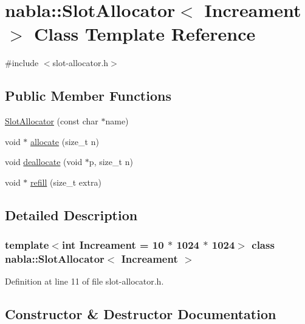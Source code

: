 \hypertarget{classnabla_1_1_slot_allocator}{}\section{nabla\+::Slot\+Allocator$<$ Increament $>$ Class Template Reference}
\label{classnabla_1_1_slot_allocator}


{\ttfamily \#include $<$slot-\/allocator.\+h$>$}

\subsection*{Public Member Functions}
\begin{DoxyCompactItemize}
\item 
\mbox{\hyperlink{classnabla_1_1_slot_allocator_ad7420ddd23485e10c051502a30303ead}{Slot\+Allocator}} (const char $\ast$name)
\item 
void $\ast$ \mbox{\hyperlink{classnabla_1_1_slot_allocator_a68798c2c090a8435776be5c1fae69741}{allocate}} (size\+\_\+t n)
\item 
void \mbox{\hyperlink{classnabla_1_1_slot_allocator_ac273b682057f051c4c226e397094b270}{deallocate}} (void $\ast$p, size\+\_\+t n)
\item 
void $\ast$ \mbox{\hyperlink{classnabla_1_1_slot_allocator_af32ebf292dd6f77447e64cf0e3571e50}{refill}} (size\+\_\+t extra)
\end{DoxyCompactItemize}


\subsection{Detailed Description}
\subsubsection*{template$<$int Increament = 10 $\ast$ 1024 $\ast$ 1024$>$\newline
class nabla\+::\+Slot\+Allocator$<$ Increament $>$}



Definition at line 11 of file slot-\/allocator.\+h.



\subsection{Constructor \& Destructor Documentation}
\mbox{\label{classnabla_1_1_slot_allocator_ad7420ddd23485e10c051502a30303ead}} 
